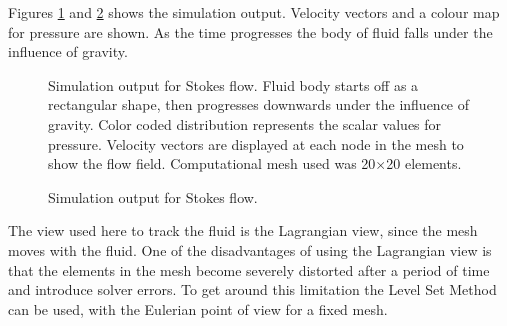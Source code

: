 Figures \ref{FLUID OUTPUT1} and \ref{FLUID OUTPUT2} shows the simulation output. Velocity vectors and a colour map for pressure are shown. As the time progresses the body of fluid falls under the influence of gravity. 
% 
\begin{figure}[ht]
\center
{}
\caption{Simulation output for Stokes flow. Fluid body starts off as a rectangular shape, then progresses downwards under the influence of gravity. Color coded distribution represents the scalar values for pressure. Velocity vectors are displayed at each node in the mesh to show the flow field. Computational mesh used was 20$\times$20 elements.}
\label{FLUID OUTPUT1}
\end{figure}
%
\begin{figure}[ht]
\center
{}
\caption{Simulation output for Stokes flow.}
\label{FLUID OUTPUT2}
\end{figure}
%
The view used here to track the fluid is the Lagrangian view, since the mesh moves with the fluid. One of the disadvantages of using the Lagrangian view is that the elements in the mesh become severely distorted after a period of time and introduce solver errors. To get around this limitation the Level Set Method can be used, with the Eulerian point of view for a fixed mesh. 
